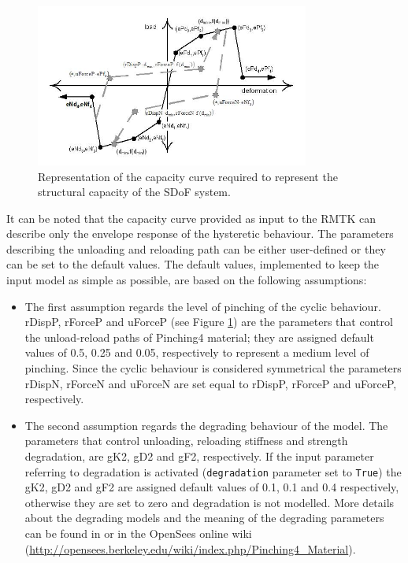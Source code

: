 \begin{figure}[htb]
  \centering
      \includegraphics[width=9cm]{figures/Pinching4.jpg}
  \caption{Representation of the capacity curve required to represent the structural capacity of the SDoF system.}
  \label{fig:backbone}
\end{figure}

It can be noted that the capacity curve provided as input to the RMTK can describe only the envelope response of the hysteretic behaviour. The parameters describing the unloading and reloading path can be either user-defined or they can be set to the default values. The default values, implemented to keep the input model as simple as possible, are based on the following assumptions:\\

\begin{itemize}
\item The first assumption regards the level of pinching of the cyclic behaviour. rDispP, rForceP and uForceP (see Figure \ref{fig:backbone}) are the parameters that control the unload-reload paths of Pinching4 material; they are assigned default values of 0.5, 0.25 and 0.05, respectively to represent a medium level of pinching. Since the cyclic behaviour is considered symmetrical the parameters rDispN, rForceN and uForceN are set equal to rDispP, rForceP and uForceP, respectively.
\item The second assumption regards the degrading behaviour of the model. The parameters that control unloading, reloading stiffness and strength degradation, are gK2, gD2 and gF2, respectively. If the input parameter referring to degradation is activated (\verb=degradation= parameter set to \verb=True=) the gK2, gD2 and gF2 are assigned default values of 0.1, 0.1 and 0.4 respectively, otherwise they are set to zero and degradation is not modelled. More details about the degrading models and the meaning of the degrading parameters can be found in \citep{LowesEtAl2003} or in the OpenSees online wiki (\href{http://opensees.berkeley.edu/wiki/index.php/Pinching4_Material}{http://opensees.berkeley.edu/wiki/index.php/Pinching4\_Material}).
\end{itemize}

